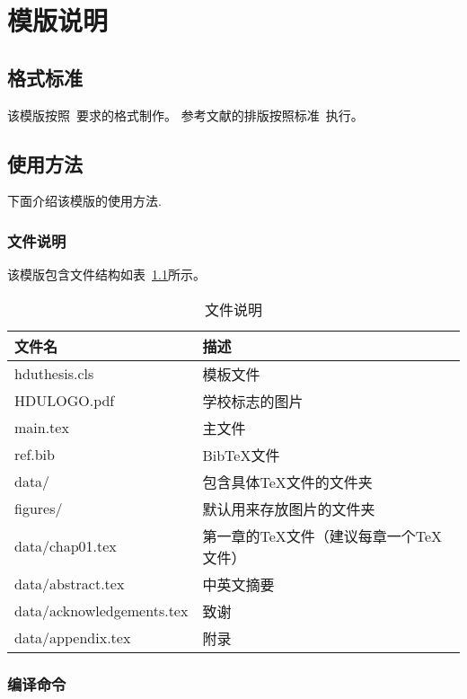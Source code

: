 
\chapter{模版说明}

\section{格式标准}

该模版按照~\cite{hdy2012311}要求的格式制作。
参考文献的排版按照标准~\cite{gbt7714-2005}执行。

\section{使用方法}

下面介绍该模版的使用方法.

\subsection{文件说明}

该模版包含文件结构如表~\ref{tab:file}所示。

\begin{table}[htp]
    \centering
    \caption{文件说明}
    \begin{tabular}{ll}
      \toprule
      文件名          & 描述                         \\
      \midrule
      hduthesis.cls   & 模板文件                     \\
      HDULOGO.pdf     & 学校标志的图片 \\
      main.tex & 主文件 \\
      ref.bib & BibTeX文件    \\
      data/ & 包含具体TeX文件的文件夹 \\
      figures/ & 默认用来存放图片的文件夹 \\
      data/chap01.tex & 第一章的TeX文件（建议每章一个TeX文件）\\
      data/abstract.tex & 中英文摘要 \\
      data/acknowledgements.tex & 致谢 \\
      data/appendix.tex & 附录 \\
      \bottomrule
    \end{tabular}
    \label{tab:file}
  \end{table}
  
\subsection{编译命令}

